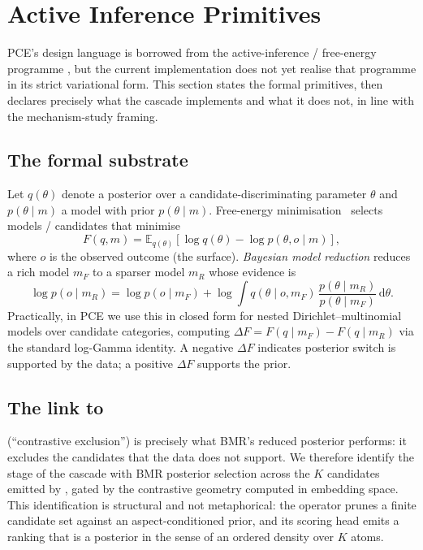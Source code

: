 \section{Active Inference Primitives}\label{sec:active_inference_background}

PCE's design language is borrowed from the active-inference / free-energy programme \citep{Friston2010FreeEnergyUnifiedBrainTheory,Friston2017ActiveInferenceCuriosity}, but the current implementation does not yet realise that programme in its strict variational form. This section states the formal primitives, then declares precisely what the cascade implements and what it does not, in line with the mechanism-study framing.

\subsection{The formal substrate}

Let $q(\theta)$ denote a posterior over a candidate-discriminating parameter $\theta$ and $p(\theta\mid m)$ a model with prior $p(\theta\mid m)$. Free-energy minimisation~\citep{Friston2017ActiveInferenceCuriosity,Friston2010FreeEnergyUnifiedBrainTheory} selects models / candidates that minimise
\begin{equation}
F(q,m) = \mathbb{E}_{q(\theta)}\!\left[\log q(\theta) - \log p(\theta, o\mid m)\right],
\end{equation}
where $o$ is the observed outcome (the surface). \emph{Bayesian model reduction} \citep{FristonPenny2011,Friston2018BayesianModelReductionArxiv,FristonEtAl2016BayesianModelReductionEmpiricalBayesDCM} reduces a rich model $m_F$ to a sparser model $m_R$ whose evidence is
\begin{equation}
\log p(o\mid m_R) = \log p(o\mid m_F) + \log \int q(\theta\mid o, m_F)\,\frac{p(\theta\mid m_R)}{p(\theta\mid m_F)} \,\mathrm{d}\theta.
\end{equation}
Practically, in PCE we use this in closed form for nested Dirichlet--multinomial models over candidate categories, computing $\Delta F = F(q\mid m_F) - F(q\mid m_R)$ via the standard log-Gamma identity. A negative $\Delta F$ indicates posterior switch is supported by the data; a positive $\Delta F$ supports the prior.

\subsection{The link to }

 (``contrastive exclusion'') is precisely what BMR's reduced posterior performs: it excludes the candidates that the data does not support. We therefore identify the  stage of the cascade with BMR posterior selection across the $K$ candidates emitted by , gated by the  contrastive geometry computed in embedding space. This identification is structural and not metaphorical: the operator prunes a finite candidate set against an aspect-conditioned prior, and its scoring head emits a ranking that is a posterior in the sense of an ordered density over $K$ atoms.

